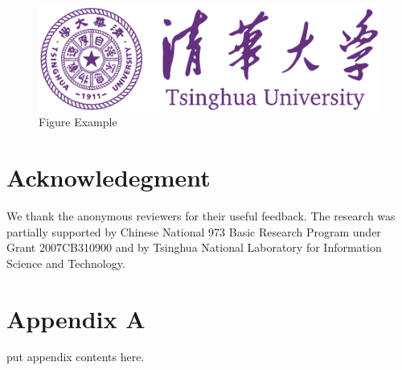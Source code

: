 \documentclass{ics}
\begin{document}
\begin{figure}
  \centering
  \includegraphics[width=.8\linewidth]{thu-whole-logo}
  \caption{Figure Example}
  \label{fig:example}
\end{figure}

\section*{Acknowledegment}
\label{sec:acknowledegment}
We thank the anonymous reviewers for their useful feedback. The research was
partially supported by Chinese National 973 Basic Research Program under Grant
2007CB310900 and by Tsinghua National Laboratory for Information Science and
Technology. 


\appendix
\section*{Appendix A}
put appendix contents here.


% 
% 
\end{document}
